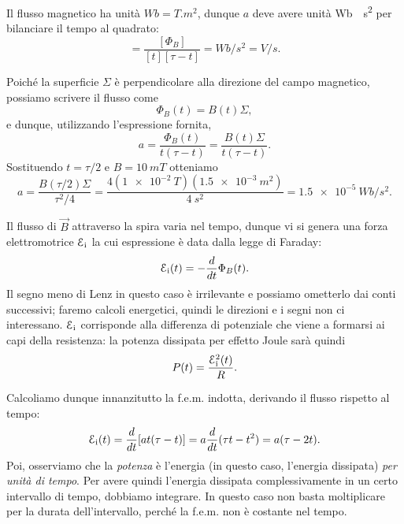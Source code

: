 \documentclass[10pt]{gulartcl}
\begin{document}
\begin{solution}
Il flusso magnetico ha unità $\unit{Wb} = \unit{T.m^2}$, dunque $a$
deve avere unità \unit{Wb \per s^2} per bilanciare il tempo al
quadrato:
\begin{equation}
    [a] = \frac{[\Phi_B]}{[t][\tau - t]} = \unit{Wb \per s^2}
        = \unit{V \per s}.
\end{equation}

Poiché la superficie $\Sigma$ è perpendicolare alla direzione del campo
magnetico, possiamo scrivere il flusso come
\begin{equation}
    \Phi_B(t) = B(t) \Sigma,
\end{equation}
e dunque, utilizzando l’espressione fornita,
\begin{equation}
    a = \frac{\Phi_B(t)}{t(\tau - t)} = \frac{B(t) \Sigma}{t(\tau - t)}.
\end{equation}
Sostituendo $t = \tau / 2$ e $B = \qty{10}{mT}$ otteniamo
\begin{equation}
    a = \frac{B(\tau / 2) \Sigma}{\tau^2 / 4}
      = \frac{4(\qty{1e-2}{T}) (\qty{1.5e-3}{m^2})}{\qty{4}{s^2}}
      = \qty{1.5e-5}{Wb \per s^2}.
\end{equation}

Il flusso di $\vec{B}$ attraverso la spira varia nel tempo, dunque vi si
genera una forza elettromotrice $\mathcal{E}_{\mathrm{i}}$ la cui espressione
è data dalla legge di Faraday:
\begin{equation}
    \femi(t) = - \diff{}{t} \Phi_B(t).
\end{equation}
Il segno meno di Lenz in questo caso è irrilevante e possiamo ometterlo dai
conti successivi; faremo calcoli energetici, quindi le direzioni e i segni
non ci interessano. $\mathcal{E}_{\mathrm{i}}$ corrisponde alla differenza di potenziale che
viene a formarsi ai capi della resistenza: la potenza dissipata per effetto
Joule sarà quindi
\begin{equation}
    P(t) = \frac{\mathcal{E}_{\mathrm{i}}^2(t)}{R}.
\end{equation}

Calcoliamo dunque innanzitutto la f.e.m. indotta, derivando il flusso
rispetto al tempo:
\begin{equation}
    \femi(t) = \diff{}{t} [a t (\tau - t)] = a \diff{}{t} (\tau t - t^2)
             = a (\tau - 2t).
\end{equation}
Poi, osserviamo che la \emph{potenza} è l’energia (in questo caso,
l’energia dissipata) \emph{per unità di tempo}. Per avere quindi l’energia
dissipata complessivamente in un certo intervallo di tempo, dobbiamo
integrare. In questo caso non basta moltiplicare per la durata
dell’intervallo, perché la f.e.m. non è costante nel tempo.


\end{solution}
\end{document}
